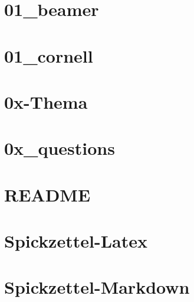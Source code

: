 



\chapter{01_beamer}
%
\chapter{01_cornell}
%
\chapter{0x-Thema}
%
\chapter{0x_questions}
%
\chapter{README}
%
\chapter{Spickzettel-Latex}
%
\chapter{Spickzettel-Markdown}
%



%
%


